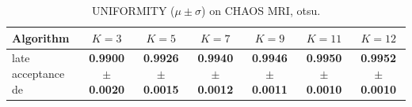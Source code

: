 \begin{table}[htbp]
\centering
\caption{UNIFORMITY ($\mu \pm \sigma$) on CHAOS MRI, otsu.}
\label{tab:exp2-otsu-uniformity}
\begin{tabular}{lcccccc}
\toprule
Algorithm & $K=3$ & $K=5$ & $K=7$ & $K=9$ & $K=11$ & $K=12$ \\
\midrule
late acceptance de & \textbf{0.9900 $\pm$ 0.0020} & \textbf{0.9926 $\pm$ 0.0015} & \textbf{0.9940 $\pm$ 0.0012} & \textbf{0.9946 $\pm$ 0.0011} & \textbf{0.9950 $\pm$ 0.0010} & \textbf{0.9952 $\pm$ 0.0010} \\
\bottomrule
\end{tabular}
\end{table}